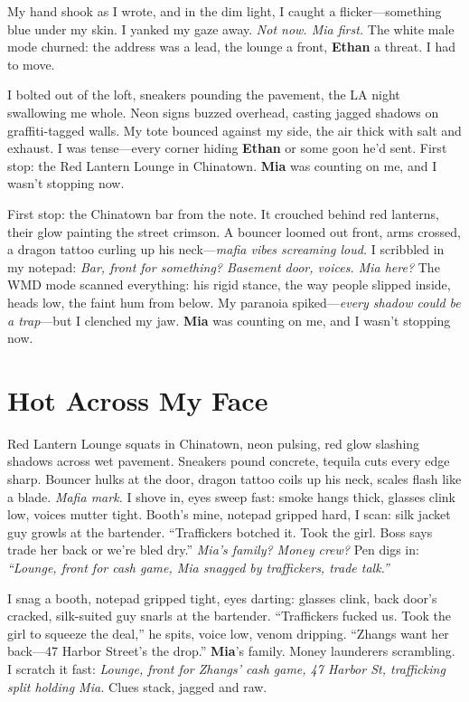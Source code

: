 \documentclass{article}
\begin{document}
My hand shook as I wrote, and in the dim light, I caught a flicker—something blue under my skin. I yanked my gaze away. \textit{Not now. Mia first.} The white male mode churned: the address was a lead, the lounge a front, \textbf{Ethan} a threat. I had to move.

I bolted out of the loft, sneakers pounding the pavement, the LA night swallowing me whole. Neon signs buzzed overhead, casting jagged shadows on graffiti-tagged walls. My tote bounced against my side, the air thick with salt and exhaust. I was tense—every corner hiding \textbf{Ethan} or some goon he’d sent. First stop: the Red Lantern Lounge in Chinatown. \textbf{Mia} was counting on me, and I wasn’t stopping now.

First stop: the Chinatown bar from the note. It crouched behind red lanterns, their glow painting the street crimson. A bouncer loomed out front, arms crossed, a dragon tattoo curling up his neck—\textit{mafia vibes screaming loud.} I scribbled in my notepad: \textit{Bar, front for something? Basement door, voices. Mia here?} The WMD mode scanned everything: his rigid stance, the way people slipped inside, heads low, the faint hum from below. My paranoia spiked—\textit{every shadow could be a trap}—but I clenched my jaw. \textbf{Mia} was counting on me, and I wasn’t stopping now.

\section*{Hot Across My Face}

Red Lantern Lounge squats in Chinatown, neon pulsing, red glow slashing shadows across wet pavement. Sneakers pound concrete, tequila cuts every edge sharp. Bouncer hulks at the door, dragon tattoo coils up his neck, scales flash like a blade. \textit{Mafia mark.} I shove in, eyes sweep fast: smoke hangs thick, glasses clink low, voices mutter tight. Booth’s mine, notepad gripped hard, I scan: silk jacket guy growls at the bartender. “Traffickers botched it. Took the girl. Boss says trade her back or we’re bled dry.” \textit{Mia’s family? Money crew?} Pen digs in: \textit{“Lounge, front for cash game, Mia snagged by traffickers, trade talk.”}

I snag a booth, notepad gripped tight, eyes darting: glasses clink, back door’s cracked, silk-suited guy snarls at the bartender. “Traffickers fucked us. Took the girl to squeeze the deal,” he spits, voice low, venom dripping. “Zhangs want her back—47 Harbor Street’s the drop.” \textbf{Mia}’s family. Money launderers scrambling. I scratch it fast: \textit{Lounge, front for Zhangs’ cash game, 47 Harbor St, trafficking split holding Mia.} Clues stack, jagged and raw.
\end{document}
